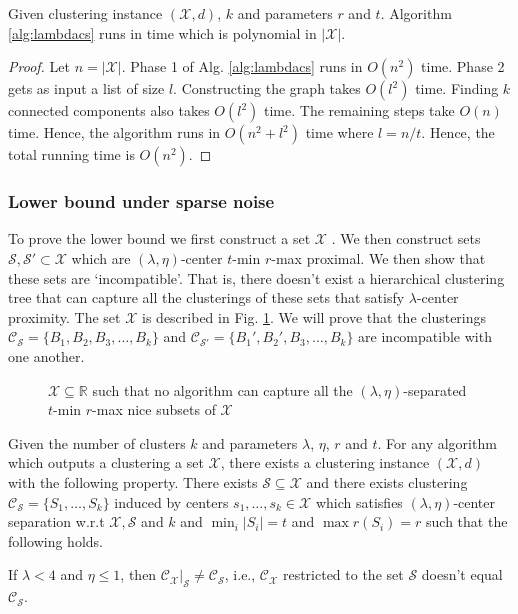 \documentclass[anon,12pt]{colt2016} %
\newcommand{\mc}{\mathcal}
\begin{document}
\begin{theorem}
Given clustering instance $(\mc X, d)$, $k$ and parameters $r$ and $t$. Algorithm \ref{alg:lambdacs} runs in time which is polynomial in $|\mc X|$.
\end{theorem}

\begin{proof}
Let $n = |\mc X|$. Phase 1 of Alg. \ref{alg:lambdacs} runs in $O(n^2)$ time. Phase 2 gets as input a list of size $l$. Constructing the graph takes $O(l^2)$ time. Finding $k$ connected components also takes $O(l^2)$ time. The remaining steps take $O(n)$ time. Hence, the algorithm runs in $O(n^2 + l^2)$ time where $l = n/t$. Hence, the total running time is $O(n^2)$.
\end{proof}

\subsubsection{Lower bound under sparse noise}
\label{section:lambdaLowerBoundSparse}

To prove the lower bound we first construct a set $\mc X$ . We then construct sets $\mc S, \mc S' \subset \mc X$ which are $(\lambda, \eta)$-center $t$-min $r$-max proximal. We then show that these sets are `incompatible'. That is, there doesn't exist a  hierarchical clustering tree that can capture all the clusterings of these sets that satisfy $\lambda$-center proximity. The set $\mc X$ is described in Fig. \ref{fig:noalglambdacs}. We will prove that the clusterings $\mc C_{\mc S} = \{B_1, B_2, B_3, \ldots, B_k\}$ and $\mc C_{\mc S'} = \{B_1', B_2', B_3, \ldots, B_k\}$ are incompatible with one another.

\begin{figure}

\caption{$\mc X \subseteq \mathbb{R}$ such that no algorithm can capture all the $(\lambda, \eta)$-separated $t$-min $r$-max nice subsets of $\mc X$}
\label{fig:noalglambdacs}
\end{figure}

\begin{theorem}
Given the number of clusters $k$ and parameters $\lambda$, $\eta$, $r$ and $t$. For any algorithm which outputs a clustering a set $\mc X$, there exists a clustering instance $(\mc X, d)$ with the following property. There exists $\mc S \subseteq \mc X$ and there exists clustering $\mc C_{\mc S} = \{S_1, \ldots, S_k\}$ induced by centers $s_1, \ldots, s_k \in \mc X$ which satisfies $(\lambda, \eta)$-center separation w.r.t $\mc X, \mc S$ and $k$ and $\min_i |S_i| = t$ and $\max r(S_i) = r$ such that the following holds.

If $\lambda < 4$ and $\eta \le 1$, then $\mc C_{\mc X}|_{\mc S} \neq \mc C_{\mc S}$, i.e., $\mc C_{\mc X}$ restricted to the set $\mc S$ doesn't equal $\mc C_{\mc S}$.
\end{theorem}
\end{document}
